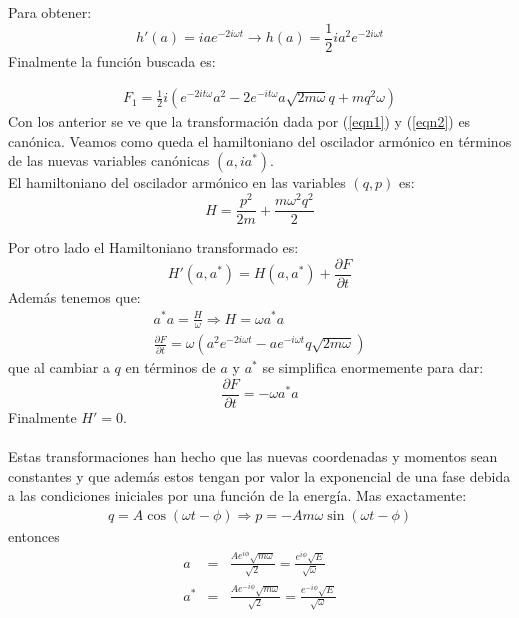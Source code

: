 \documentclass[spanish,12pt]{shreyasnotes}
\begin{document}
Para obtener:
\begin{equation}
h'(a)= i a e^{-2 i \omega  t} \longrightarrow h(a)=\frac{1}{2} i a^2 e^{-2 i \omega t }
\end{equation}
Finalmente la funci\'on buscada es:

\begin{eqnarray}
F_1=\frac{1}{2} i \left(e^{-2 i t \omega } a^2-2 e^{-i t \omega } a \sqrt{2 m \omega } q +m q^2 \omega \right)
\end{eqnarray}
Con los anterior se ve que la transformaci\'on dada por (\ref{eqn1}) y (\ref{eqn2}) es can\'onica. Veamos como queda el hamiltoniano del oscilador arm\'onico en t\'erminos de las nuevas variables can\'onicas $(a,ia^*)$.\\
El hamiltoniano del oscilador arm\'onico en las variables $(q,p)$ es:
\begin{equation}
H=\frac{p^2}{2m}+\frac{m \omega^2 q^2}{2}
\end{equation}

Por otro lado el Hamiltoniano  transformado es:
\begin{equation}
H'(a,a^*)=H(a,a^*)+\frac{\partial F}{\partial t}
\end{equation}
Adem\'as tenemos que:
\begin{eqnarray}
a^* a=\frac{H}{\omega} \Longrightarrow H=\omega  a^* a \\
\frac{\partial F}{\partial t}=\omega \left( a^2 e^{-2 i \omega t}  - a e^{-i  \omega  t  } q   \sqrt{2 m \omega } \right)
\end{eqnarray}
que al cambiar a $q$ en t\'erminos de $a$ y $a^*$ se simplifica enormemente para dar:
\begin{equation}
\frac{\partial F}{\partial t}=- \omega a^* a 
\end{equation}
Finalmente $H'=0$. \\
\\
Estas transformaciones han hecho que las nuevas coordenadas y momentos sean constantes y que adem\'as estos tengan por valor la exponencial de una fase debida a las condiciones iniciales por una funci\'on de la energ\'ia. Mas exactamente:
\begin{eqnarray}
 q=A \cos (\omega t-\phi )\Longrightarrow   p=-A m \omega  \sin (\omega t-\phi)
\end{eqnarray}
 entonces 
\begin{eqnarray}
a&=&\frac{A e^{i \phi } \sqrt{m \omega }}{\sqrt{2}}=\frac{e^{i \phi } \sqrt{E}}{\sqrt{ \omega}}\\
a^*&=&\frac{A e^{-i \phi } \sqrt{m \omega }}{\sqrt{2}}=\frac{ e^{-i \phi } \sqrt{E}}{\sqrt{ \omega} }
\end{eqnarray}
\end{document}
